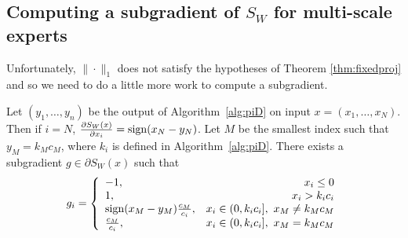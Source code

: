 \documentclass[12pt]{colt2018} %
\begin{document}
\subsection{Computing a subgradient of $S_W$ for multi-scale experts}
Unfortunately, $\|\cdot\|_1$ does not satisfy the hypotheses of Theorem \ref{thm:fixedproj} and so we need to do a little more work to compute a subgradient.
%
\begin{Proposition}\label{thm:sdgradient}
Let $(y_1,\dots,y_n)$ be the output of Algorithm~\ref{alg:piD} on input $x=(x_1,\dots,x_N)$. Then if $i=N$, $\frac{\partial S_W(x)}{\partial x_i} = \sign(x_N-y_N)$. Let $M$ be the smallest index such that $y_M=k_Mc_M$, where $k_i$ is defined in Algorithm~\ref{alg:piD}. There exists a subgradient $g\in \partial S_W(x)$ such that
\begin{align*}
g_i=\left\{\begin{array}{lr}
-1, & x_i \le 0\\
1, & x_i> k_ic_i\\
\sign(x_M-y_M)\frac{c_M}{c_i}, & x_i\in(0,k_ic_i],\ x_M\ne k_Mc_M\\
\frac{c_M}{c_i}, & x_i\in(0,k_ic_i],\ x_M=k_Mc_M
\end{array}\right.
\end{align*}
\end{Proposition}
%
\end{document}
